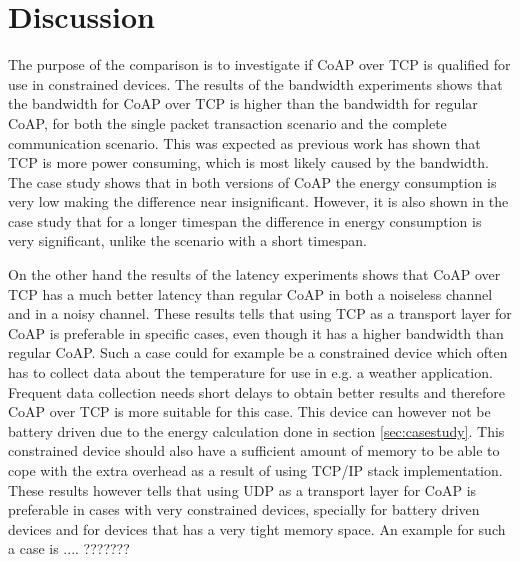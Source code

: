 \section{Discussion}\label{sec:discussion}
The purpose of the comparison is to investigate if CoAP over TCP is qualified for use in constrained devices. The results of the bandwidth experiments shows that the bandwidth for CoAP over TCP is higher than the bandwidth for regular CoAP, for both the single packet transaction scenario and the complete communication scenario. This was expected as previous work has shown that TCP is more power consuming, which is most likely caused by the bandwidth. The case study shows that in both versions of CoAP the energy consumption is very low making the difference near insignificant. However, it is also shown in the case study that for a longer timespan the difference in energy consumption is very significant, unlike the scenario with a short timespan. 

On the other hand the results of the latency experiments shows that CoAP over TCP has a much better latency than regular CoAP in both a noiseless channel and in a noisy channel. 
These results tells that using TCP as a transport layer for CoAP  is preferable in specific cases, even though it has a higher bandwidth than regular CoAP. 
Such a case could for example be a constrained device which often has to collect data about the temperature for use in e.g. a weather application. Frequent data collection needs short delays to obtain better results and therefore CoAP over TCP is more suitable for this case. This device can however not be battery driven due to the energy calculation done in section \ref{sec:casestudy}. This constrained device should also have a sufficient amount of memory to be able to cope with the extra overhead as a result of using TCP/IP stack implementation. 
These results however tells that using UDP as a transport layer for CoAP is preferable in cases with very constrained devices, specially for battery driven devices and for devices that has a very tight memory space. An example for such a case is .... ??????? 


%
%



	




